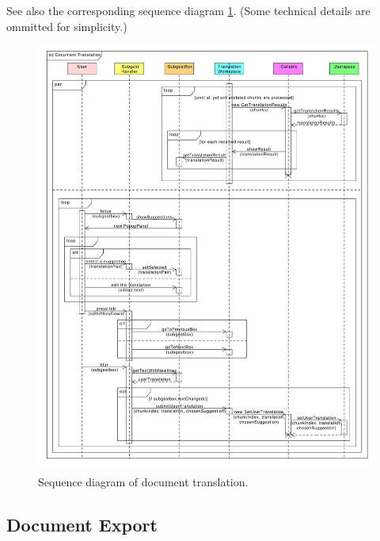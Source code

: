 See also the corresponding sequence diagram \ref{gui:sd:document_translation}.
(Some technical details are ommitted for simplicity.)

\begin{figure}[h]
\begin{center}
\includegraphics[scale=0.45]{figures/document_translation_sequence.pdf}
\end{center}
\caption{Sequence diagram of document translation.}\label{gui:sd:document_translation}
\end{figure}

\subsection{Document Export}



